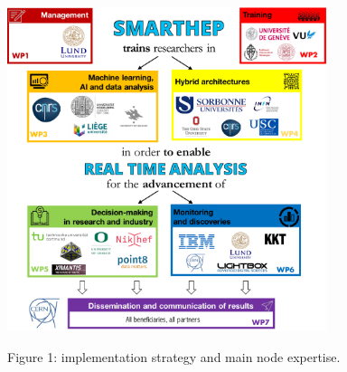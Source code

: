 \begin{center}
\includegraphics[width=0.7\textwidth]{figs/NetworkCompositionCombinedImplementation} %
\begin{center}\footnotesize \label{fig:implementation}
Figure 1: \acronym implementation strategy and main node expertise.
\end{center}%
\normalsize 
\vspace{-2mm}
\end{center}
 
